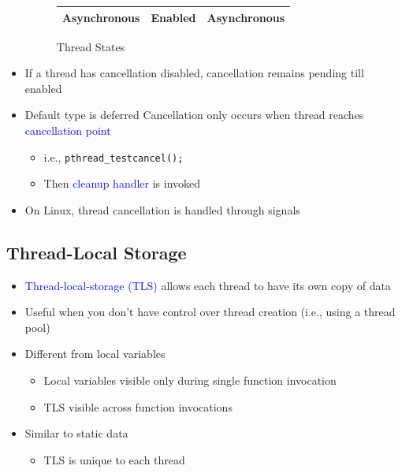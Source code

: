 \documentclass[oneside]{book}
\begin{document}
\begin{itemize}
\begin{figure}[H]
\begin{tabular}{|c|c|c|}
                                \hline
                                Asynchronous & Enabled & Asynchronous\\
                                \hline
                            \end{tabular}
                            \caption{Thread States}
                        \end{figure}
                    \item If a thread has cancellation disabled, cancellation remains pending till enabled
                    \item Default type is deferred
                        \subitem Cancellation only occurs when thread reaches \textcolor{blue}{cancellation point}
                            \begin{itemize}
                                \item i.e., \texttt{pthread_testcancel();}
                                \item Then \textcolor{blue}{cleanup handler} is invoked
                            \end{itemize}
                    \item On Linux, thread cancellation is handled through signals
                \end{itemize}
            \subsection{Thread-Local Storage}
                \begin{itemize}
                    \item \textcolor{blue}{Thread-local-storage (TLS)} allows each thread to have its own copy of data
                    \item Useful when you don't have control over thread creation (i.e., using a thread pool)
                    \item Different from local variables
                        \begin{itemize}
                            \item Local variables visible only during single function invocation
                            \item TLS visible across function invocations
                        \end{itemize}
                    \item Similar to static data
                        \begin{itemize}
                            \item TLS is unique to each thread
                        \end{itemize}
                \end{itemize}
\end{document}

